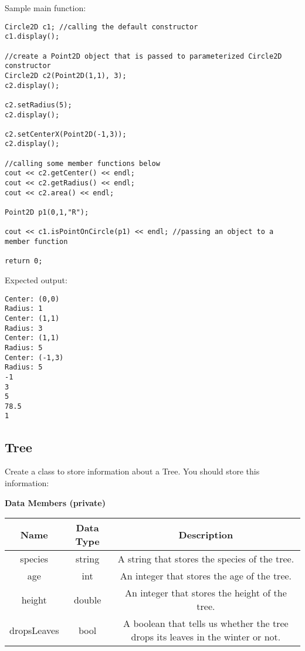 \begin{example}
    Sample main function:
\begin{verbatim}
Circle2D c1; //calling the default constructor
c1.display();

//create a Point2D object that is passed to parameterized Circle2D constructor 
Circle2D c2(Point2D(1,1), 3); 
c2.display();

c2.setRadius(5);
c2.display();

c2.setCenterX(Point2D(-1,3));
c2.display();

//calling some member functions below
cout << c2.getCenter() << endl;
cout << c2.getRadius() << endl;
cout << c2.area() << endl;

Point2D p1(0,1,"R");

cout << c1.isPointOnCircle(p1) << endl; //passing an object to a member function

return 0;
\end{verbatim}

Expected output:

\begin{verbatim}
Center: (0,0)
Radius: 1
Center: (1,1)
Radius: 3
Center: (1,1)
Radius: 5
Center: (-1,3)
Radius: 5
-1
3
5
78.5
1
\end{verbatim}
\end{example}

\subsection{Tree}
Create a class to store information about a Tree. You should store this information:

\textbf{Data Members (private)}
\begin{table}[H]
    \centering
    \begin{tabular}{c|c|c}
Name & Data Type & Description \\ \hline
species & string & A string that stores the species of the tree. \\
age & int & An integer that stores the age of the tree. \\
height & double & An integer that stores the height of the tree. \\
dropsLeaves & bool & A boolean that tells us whether the tree drops its leaves in the winter or not. \\
    \end{tabular}
\end{table}


